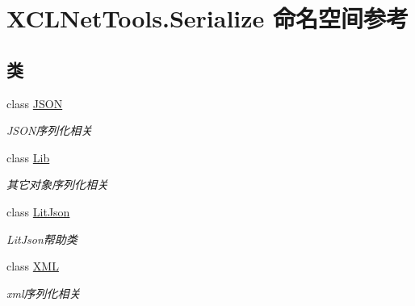 \hypertarget{namespace_x_c_l_net_tools_1_1_serialize}{}\section{X\+C\+L\+Net\+Tools.\+Serialize 命名空间参考}
\label{namespace_x_c_l_net_tools_1_1_serialize}
\subsection*{类}
\begin{DoxyCompactItemize}
\item 
class \hyperlink{class_x_c_l_net_tools_1_1_serialize_1_1_j_s_o_n}{J\+S\+ON}
\begin{DoxyCompactList}\small\item\em J\+S\+O\+N序列化相关 \end{DoxyCompactList}\item 
class \hyperlink{class_x_c_l_net_tools_1_1_serialize_1_1_lib}{Lib}
\begin{DoxyCompactList}\small\item\em 其它对象序列化相关 \end{DoxyCompactList}\item 
class \hyperlink{class_x_c_l_net_tools_1_1_serialize_1_1_lit_json}{Lit\+Json}
\begin{DoxyCompactList}\small\item\em Lit\+Json帮助类 \end{DoxyCompactList}\item 
class \hyperlink{class_x_c_l_net_tools_1_1_serialize_1_1_x_m_l}{X\+ML}
\begin{DoxyCompactList}\small\item\em xml序列化相关 \end{DoxyCompactList}\end{DoxyCompactItemize}
